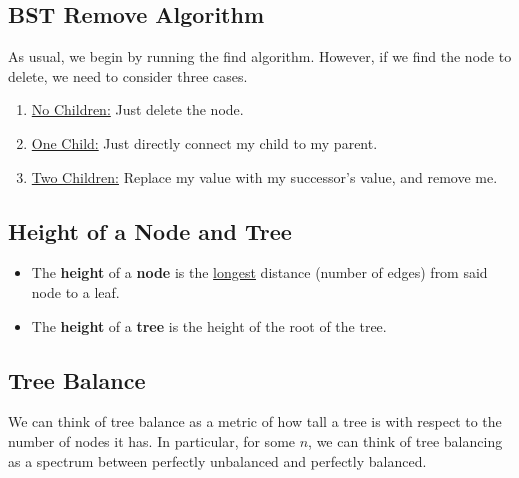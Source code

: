 \documentclass[letterpaper]{article}
\begin{document}
\subsection{BST Remove Algorithm}
As usual, we begin by running the find algorithm. However, if we find the node to delete, we need to consider three cases. 

\begin{enumerate}
    \item \underline{No Children:} Just delete the node. 
    \item \underline{One Child:} Just directly connect my child to my parent. 
    \item \underline{Two Children:} Replace my value with my successor's value, and remove me. 
\end{enumerate}

\subsection{Height of a Node and Tree}
\begin{itemize}
    \item The \textbf{height} of a \textbf{node} is the \underline{longest} distance (number of edges) from said node to a leaf. 
    \item The \textbf{height} of a \textbf{tree} is the height of the root of the tree. 
\end{itemize}

\subsection{Tree Balance}
We can think of tree balance as a metric of how tall a tree is with respect to the number of nodes it has. In particular, for some $n$, we can think of tree balancing as a spectrum between perfectly unbalanced and perfectly balanced. 

\bigskip 
\end{document}
